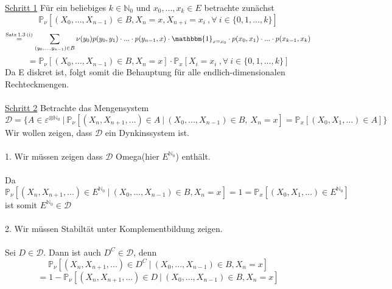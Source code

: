 \underline{Schritt 1} Für ein beliebiges $k \in \mathbb{N}_{0}$ und $x_{0},...,x_{k} \in E$ betrachte zunächst 
\begin{equation*}
\mathbb{P}_{\nu}[(X_{0},...,X_{n-1}) \in B ,  X_{n} = x, X_{n+i} = x_{i} \: , \forall \: i \in \lbrace 0,1,...,k \rbrace]
\end{equation*}
\begin{equation*}
\stackrel{\mathrm{Satz \: 1.3 \: (i)}}{=} \sum_{(y_{0},...,y_{n-1}) \in B} \nu(y_{0})p(y_{0},y_{1}) \cdot ... \cdot p(y_{n-1},x) \cdot \mathbbm{1}_{ x = x_{0}} \cdot p(x_{0},x_{1})  \cdot ... \cdot p(x_{k-1},x_{k})
\end{equation*}
\begin{equation*}
= \mathbb{P}_{\nu}[(X_{0},...,X_{n-1}) \in B, X_{n} = x] \cdot  \mathbb{P}_{x}[X_{i} = x_{i} \: , \forall \: i \in \lbrace 0,1,...,k \rbrace]
\end{equation*}
Da E diskret ist, folgt somit die Behauptung für alle endlich-dimensionalen Rechteckmengen.
\\
\\
\underline{Schritt 2} Betrachte das Mengensystem
\begin{equation*}
\mathcal{D} = \lbrace A \in \varepsilon^{ \otimes \mathbb{N}_{0}} \: | \: \mathbb{P}_{\nu}[(X_{n},X_{n+1},...) \in A \: | \: (X_{0},...,X_{n-1})  \in B, \: X_{n} = x] = \mathbb{P}_{x}[(X_{0},X_{1},...) \in A] \rbrace
\end{equation*}
Wir wollen zeigen, dass $\mathcal{D}$ ein Dynkinssystem ist.
\\
\\
1. Wir müssen zeigen dass $\mathcal{D}$ Omega(hier $E^{\mathbb{N}_{0}}$) enthält.
\\
\\
Da $\mathbb{P}_{\nu}[(X_{n},X_{n+1},...) \in E^{\mathbb{N}_{0}}  \: | \: (X_{0},...,X_{n-1})  \in B, X_{n} = x] = 1 = \mathbb{P}_{x}[(X_{0},X_{1},...) \in E^{\mathbb{N}_{0}}]$ ist somit $E^{\mathbb{N}_{0}} \in \mathcal{D}$ 
\\
\\
2. Wir müssen Stabiltät unter Komplementbildung zeigen.
\\
\\
Sei $D \in \mathcal{D}$. Dann ist auch $D^{C} \in \mathcal{D}$, denn
\begin{equation*}
\mathbb{P}_{\nu}[(X_{n},X_{n+1},...) \in D^{C} \: | \: (X_{0},...,X_{n-1})  \in B, X_{n} = x]
\end{equation*}
\begin{equation*}
= 1 - \mathbb{P}_{\nu}[(X_{n},X_{n+1},...) \in D \: | \: (X_{0},...,X_{n-1})  \in B, X_{n} = x]
\end{equation*}
